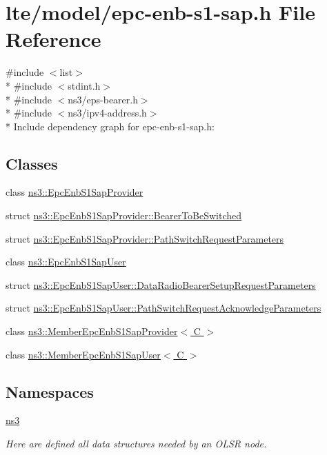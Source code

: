 \hypertarget{epc-enb-s1-sap_8h}{}\section{lte/model/epc-\/enb-\/s1-\/sap.h File Reference}
\label{epc-enb-s1-sap_8h}
{\ttfamily \#include $<$list$>$}\\*
{\ttfamily \#include $<$stdint.\+h$>$}\\*
{\ttfamily \#include $<$ns3/eps-\/bearer.\+h$>$}\\*
{\ttfamily \#include $<$ns3/ipv4-\/address.\+h$>$}\\*
Include dependency graph for epc-\/enb-\/s1-\/sap.h\+:
\subsection*{Classes}
\begin{DoxyCompactItemize}
\item 
class \hyperlink{classns3_1_1EpcEnbS1SapProvider}{ns3\+::\+Epc\+Enb\+S1\+Sap\+Provider}
\item 
struct \hyperlink{structns3_1_1EpcEnbS1SapProvider_1_1BearerToBeSwitched}{ns3\+::\+Epc\+Enb\+S1\+Sap\+Provider\+::\+Bearer\+To\+Be\+Switched}
\item 
struct \hyperlink{structns3_1_1EpcEnbS1SapProvider_1_1PathSwitchRequestParameters}{ns3\+::\+Epc\+Enb\+S1\+Sap\+Provider\+::\+Path\+Switch\+Request\+Parameters}
\item 
class \hyperlink{classns3_1_1EpcEnbS1SapUser}{ns3\+::\+Epc\+Enb\+S1\+Sap\+User}
\item 
struct \hyperlink{structns3_1_1EpcEnbS1SapUser_1_1DataRadioBearerSetupRequestParameters}{ns3\+::\+Epc\+Enb\+S1\+Sap\+User\+::\+Data\+Radio\+Bearer\+Setup\+Request\+Parameters}
\item 
struct \hyperlink{structns3_1_1EpcEnbS1SapUser_1_1PathSwitchRequestAcknowledgeParameters}{ns3\+::\+Epc\+Enb\+S1\+Sap\+User\+::\+Path\+Switch\+Request\+Acknowledge\+Parameters}
\item 
class \hyperlink{classns3_1_1MemberEpcEnbS1SapProvider}{ns3\+::\+Member\+Epc\+Enb\+S1\+Sap\+Provider$<$ C $>$}
\item 
class \hyperlink{classns3_1_1MemberEpcEnbS1SapUser}{ns3\+::\+Member\+Epc\+Enb\+S1\+Sap\+User$<$ C $>$}
\end{DoxyCompactItemize}
\subsection*{Namespaces}
\begin{DoxyCompactItemize}
\item 
 \hyperlink{namespacens3}{ns3}
\begin{DoxyCompactList}\small\item\em Here are defined all data structures needed by an O\+L\+SR node. \end{DoxyCompactList}\end{DoxyCompactItemize}
